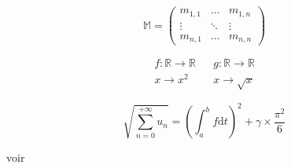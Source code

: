 \documentclass[12pt,a4paper]{scrartcl}
\theoremstyle{plain}
\begin{document}
\[
	\mathbb{M} = 
	\begin{pmatrix}
		m_{1,1} & \dots & m_{1,n} \\
		\vdots & \ddots & \vdots \\
		m_{n,1} & \dots & m_{n,n}
	\end{pmatrix}
\]

\begin{align}
	f:\mathbb{R}\to\mathbb{R} && g: \mathbb{R}\to\mathbb{R}\\
	x \to x^2 && x \to \sqrt{x}
\end{align}

\[
	\sqrt{\sum_{n=0}^{+\infty} u_n} 
	= 
	\left( \int_{a}^{b} f \mathrm{d} t\right) ^2 + \gamma \times \frac{\pi^2}{6}
\]


voir \cite{El03}




\end{document}
